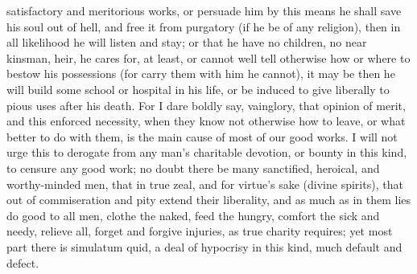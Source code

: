 {satisfactory and meritorious works, or persuade him by this means he
shall save his soul out of hell, and free it from purgatory (if he be
of any religion), then in all likelihood he will listen and stay; or
that he have no children, no near kinsman, heir, he cares for, at
least, or cannot well tell otherwise how or where to bestow his
possessions (for carry them with him he cannot), it may be then he will
build some school or hospital in his life, or be induced to give
liberally to pious uses after his death. For I dare boldly say,
vainglory, that opinion of merit, and this enforced necessity, when
they know not otherwise how to leave, or what better to do with them,
is the main cause of most of our good works. I will not urge this to
derogate from any man's charitable devotion, or bounty in this kind, to
censure any good work; no doubt there be many sanctified, heroical, and
worthy-minded men, that in true zeal, and for virtue's sake (divine
spirits), that out of commiseration and pity extend their liberality,
and as much as in them lies do good to all men, clothe the naked, feed
the hungry, comfort the sick and needy, relieve all, forget and forgive
injuries, as true charity requires; yet most part there is simulatum
quid, a deal of hypocrisy in this kind, much default and defect.

}
